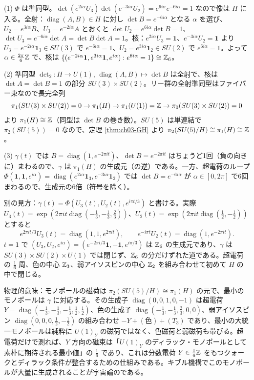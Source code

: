 \begin{solution}
(1) $\Phi$ は準同型。$\det(e^{2i\alpha}U_3)\det(e^{-3i\alpha}U_2)=e^{6i\alpha}e^{-6i\alpha}=1$ なので像は $H$ に入る。全射：$\operatorname{diag}(A,B)\in H$ に対し $\det B=e^{-6i\alpha}$ となる $\alpha$ を選び、$U_2=e^{3i\alpha}B$、$U_3=e^{-2i\alpha}A$ とおくと $\det U_2=e^{6i\alpha}\det B=1$、$\det U_3=e^{-6i\alpha}\det A=\det B\det A=1$。核：$e^{2i\alpha}U_3=\mathbf 1$、$e^{-3i\alpha}U_2=\mathbf 1$ より $U_3=e^{-2i\alpha}\mathbf 1_3\in SU(3)$ で $e^{-6i\alpha}=1$、$U_2=e^{3i\alpha}\mathbf 1_2\in SU(2)$ で $e^{6i\alpha}=1$。よって $\alpha\in\frac{2\pi}{6}\mathbb{Z}$ で、核は $\{(e^{-2i\alpha}\mathbf 1,e^{3i\alpha}\mathbf 1,e^{i\alpha}):e^{6i\alpha}=1\}\cong\mathbb{Z}_6$。

(2) 準同型 $\det_2\colon H\to U(1)$, $\operatorname{diag}(A,B)\mapsto\det B$ は全射で、核は $\det A=\det B=1$ の部分 $SU(3)\times SU(2)$。リー群の全射準同型はファイバー束なので長完全列
\[
\pi_1(SU(3)\times SU(2))=0\to\pi_1(H)\to\pi_1(U(1))=\mathbb{Z}\to\pi_0(SU(3)\times SU(2))=0
\]
より $\pi_1(H)\cong\mathbb{Z}$（同型は $\det B$ の巻き数）。$SU(5)$ は単連結で $\pi_2(SU(5))=0$ なので、定理 \ref{thm:ch03-GH} より $\pi_2(SU(5)/H)\cong\pi_1(H)\cong\mathbb{Z}$。

(3) $\gamma(t)$ では $B=\operatorname{diag}(1,e^{-2\pi it})$、$\det B=e^{-2\pi it}$ はちょうど1回（負の向きに）まわるので、$\gamma$ は $\pi_1(H)$ の生成元（の逆）である。一方、超電荷のループ $\Phi(\mathbf 1,\mathbf 1,e^{i\alpha})=\operatorname{diag}(e^{2i\alpha}\mathbf 1_3,e^{-3i\alpha}\mathbf 1_2)$ では $\det B=e^{-6i\alpha}$ が $\alpha\in[0,2\pi]$ で6回まわるので、生成元の6倍（符号を除く）。

別の見方：$\gamma(t)=\Phi(U_3(t),U_2(t),e^{i\pi t/3})$ と書ける。実際 $U_3(t)=\exp(2\pi it\operatorname{diag}(-\frac13,-\frac13,\frac23))$、$U_2(t)=\exp(2\pi it\operatorname{diag}(\frac12,-\frac12))$ とすると
\[
e^{2\pi it/3}U_3(t)=\operatorname{diag}(1,1,e^{2\pi it}),\qquad e^{-i\pi t}U_2(t)=\operatorname{diag}(1,e^{-2\pi it}).
\]
$t=1$ で $(U_3,U_2,e^{i\alpha})=(e^{-2\pi i/3}\mathbf 1,-\mathbf 1,e^{i\pi/3})$ は $\mathbb{Z}_6$ の生成元であり、$\gamma$ は $SU(3)\times SU(2)\times U(1)$ では閉じず、$\mathbb{Z}_6$ の分だけずれた道である。超電荷の $\frac16$ 周、色の中心 $\mathbb{Z}_3$、弱アイソスピンの中心 $\mathbb{Z}_2$ を組み合わせて初めて $H$ の中で閉じる。

物理的意味：モノポールの磁荷は $\pi_2(SU(5)/H)\cong\pi_1(H)$ の元で、最小のモノポールは $\gamma$ に対応する。その生成子 $\operatorname{diag}(0,0,1,0,-1)$ は超電荷 $Y=\operatorname{diag}(-\frac13,-\frac13,-\frac13,\frac12,\frac12)$、色の生成子 $\operatorname{diag}(-\frac13,-\frac13,\frac23,0,0)$、弱アイソスピン $\operatorname{diag}(0,0,0,\frac12,-\frac12)$ の組み合わせ $-Y+(\text{色})+(T_3)$ であり、最小の大統一モノポールは純粋に $U(1)_Y$ の磁荷ではなく、色磁荷と弱磁荷も帯びる。超電荷だけで測れば、$Y$ 方向の磁束は「$U(1)_Y$ のディラック・モノポールとして素朴に期待される最小値」の $\frac16$ であり、これは分数電荷 $Y\in\frac16\mathbb{Z}$ をもつクォークとディラック条件が整合するための仕組みである。キブル機構でこのモノポールが大量に生成されることが宇宙論のである。
\end{solution}

